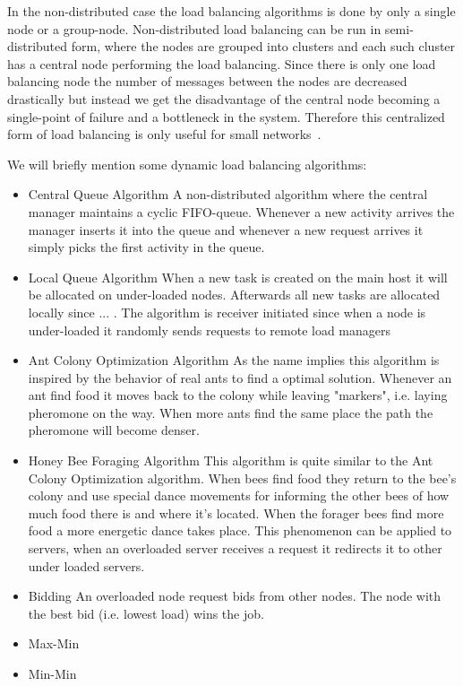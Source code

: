 \documentclass{cslthse-msc}
\begin{document}
In the non-distributed case the load balancing algorithms is done by only a single node or a group-node. Non-distributed load balancing can be run in semi-distributed form, where the nodes are grouped into clusters and each such cluster has a central node performing the load balancing. Since there is only one load balancing node the number of messages between the nodes are decreased drastically but instead we get the disadvantage of the central node becoming a single-point of failure and a bottleneck in the system. Therefore this centralized form of load balancing is only useful for small networks~\cite{perfAnalysisLoadCloud}.
\fi

\iffalse
We will briefly mention some dynamic load balancing algorithms: %

\begin{itemize}
\item Central Queue Algorithm A non-distributed algorithm where the central manager maintains a cyclic FIFO-queue. Whenever a new activity arrives the manager inserts it into the queue and whenever a new request arrives it simply picks the first activity in the queue. 

\item Local Queue Algorithm When a new task is created on the main host it will be allocated on under-loaded nodes. Afterwards all new tasks are allocated locally since ... \cite{perfAnalysisLoadCloud}. The algorithm is receiver initiated since when a node is under-loaded it randomly sends requests to remote load managers

\item Ant Colony Optimization Algorithm As the name implies this algorithm is inspired by the behavior of real ants to find a optimal solution. Whenever an ant find food it moves back to the colony while leaving "markers", i.e. laying pheromone on the way. When more ants find the same place the path the pheromone will become denser. 

\item Honey Bee Foraging Algorithm This algorithm is quite similar to the Ant Colony Optimization algorithm. When bees find food they return to the bee's colony and use special dance movements for informing the other bees of how much food there is and where it's located. When the forager bees find more food a more energetic dance takes place. This phenomenon can be applied to servers, when an overloaded server receives a request it redirects it to other under loaded servers.


\item Bidding An overloaded node request bids from other nodes. The node with the best bid (i.e. lowest load) wins the job.
\item Max-Min 
\item Min-Min 
\end{itemize}
\end{document}
